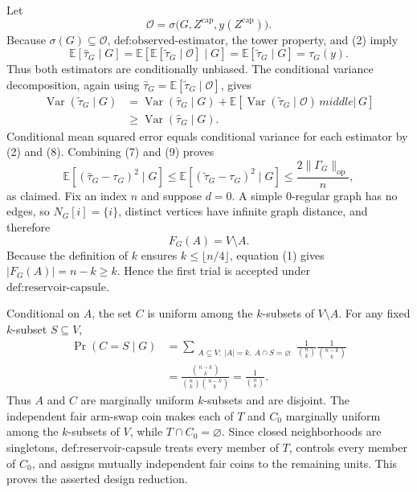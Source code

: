 Let
\[
 \mathscr O=\sigma\bigl(G,Z^{\mathrm{cap}},y(Z^{\mathrm{cap}})\bigr).
\]
Because \(\sigma(G)\subseteq\mathscr O\), \(\text{def:observed-estimator}\), the tower property, and (2) imply
\[
 \mathbb E[\widehat\tau_G\mid G]
 =\mathbb E\!\left[\mathbb E[\widetilde\tau_G\mid\mathscr O]\mid G\right]
 =\mathbb E[\widetilde\tau_G\mid G]
 =\tau_G(y). \tag{8}
\]
Thus both estimators are conditionally unbiased.  The conditional variance decomposition, again using \(\widehat\tau_G=\mathbb E[\widetilde\tau_G\mid\mathscr O]\), gives
\[
\begin{aligned}
 \operatorname{Var}(\widetilde\tau_G\mid G)
 &=\operatorname{Var}(\widehat\tau_G\mid G)
   +\mathbb E\!\left[
      \operatorname{Var}(\widetilde\tau_G\mid\mathscr O)
      \,middle|\,G\right]\\
 &\ge \operatorname{Var}(\widehat\tau_G\mid G). \tag{9}
\end{aligned}
\]
Conditional mean squared error equals conditional variance for each estimator by (2) and (8).  Combining (7) and (9) proves
\[
 \mathbb E[(\widehat\tau_G-\tau_G)^2\mid G]
 \le \mathbb E[(\widetilde\tau_G-\tau_G)^2\mid G]
 \le \frac{2\lVert\Gamma_G\rVert_{\mathrm{op}}}{n},
\]
as claimed.
Fix an index \(n\) and suppose \(d=0\).  A simple \(0\)-regular graph has no edges, so \(N_G[i]=\{i\}\), distinct vertices have infinite graph distance, and therefore
\[
 F_G(A)=V\setminus A. \tag{1}
\]
Because the definition of \(k\) ensures \(k\le\lfloor n/4\rfloor\), equation (1) gives \(|F_G(A)|=n-k\ge k\).  Hence the first trial is accepted under \(\text{def:reservoir-capsule}\).

Conditional on \(A\), the set \(C\) is uniform among the \(k\)-subsets of \(V\setminus A\).  For any fixed \(k\)-subset \(S\subseteq V\),
\[
\begin{aligned}
 \Pr(C=S\mid G)
 &=\sum_{\substack{A\subseteq V:\ |A|=k,\ A\cap S=\varnothing}}
   \frac1{\binom nk}\frac1{\binom{n-k}{k}}\\
 &=\frac{\binom{n-k}{k}}
         {\binom nk\binom{n-k}{k}}
 =\frac1{\binom nk}. \tag{2}
\end{aligned}
\]
Thus \(A\) and \(C\) are marginally uniform \(k\)-subsets and are disjoint.  The independent fair arm-swap coin makes each of \(T\) and \(C_0\) marginally uniform among the \(k\)-subsets of \(V\), while \(T\cap C_0=\varnothing\).  Since closed neighborhoods are singletons, \(\text{def:reservoir-capsule}\) treats every member of \(T\), controls every member of \(C_0\), and assigns mutually independent fair coins to the remaining units.  This proves the asserted design reduction.

